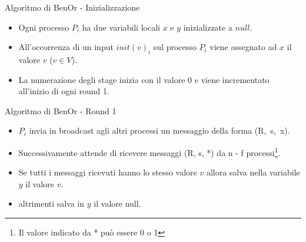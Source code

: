\documentclass{beamer}
\begin{document}
    \begin{frame}{Algoritmo di BenOr - Inizializzazione}
        \begin{itemize}
            \item Ogni processo $P_{i}$ ha due variabili locali $x$ e $y$ inizializzate a $null$.

            \item All'occorrenza di un input $init(v)_{i}$ sul processo $P_{i}$ viene assegnato ad $x$ il valore $v$ ($v \in V$).

            \item La numerazione degli stage inizia con il valore 0 e viene incrementato all'inizio di ogni round 1.
        \end{itemize}
    \end{frame}


    \begin{frame}{Algoritmo di BenOr - Round 1}
        \begin{itemize}
            \item $P_{i}$ invia in broadcast agli altri processi un messaggio della forma \mbox{(R, s, x)}.

            \item Successivamente attende di ricevere messaggi (R, s, *) da n - f processi\footnote{Il valore indicato da * può essere 0 o 1}.

            \item Se tutti i messaggi ricevuti hanno lo stesso valore $v$ allora salva nella variabile $y$ il valore $v$.

            \item altrimenti salva in $y$ il valore null.

        \end{itemize}
    \end{frame}
\end{document}
